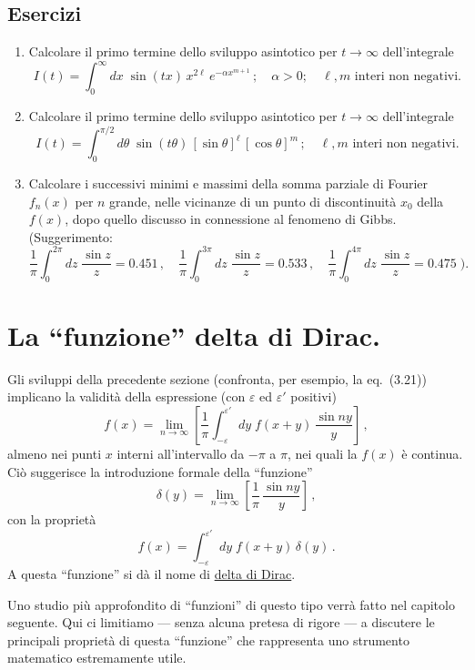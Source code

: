 \documentclass[11pt, a4paper]{book}
\numberwithin{equation}{section}
\newenvironment{esercizi}{\subsection*{Esercizi}\begin{enumerate}}{\end{enumerate}}
\begin{document}
\begin{esercizi}
\item Calcolare il primo termine dello sviluppo asintotico per $t\to\infty$ dell'integrale
\[
  I(t) = \int_0^\infty dx\;\sin(tx)\,x^{2\ell}\,e^{-\alpha x^{m+1}}\,;\quad
  \alpha>0;\quad \ell,m \text{ interi non negativi.}
\]

\item Calcolare il primo termine dello sviluppo asintotico per $t\to\infty$ dell'integrale
\[
  I(t) = \int_0^{\pi/2} d\theta\;\sin(t\theta)\,[\sin\theta]^\ell\,[\cos\theta]^m\,;\quad
  \ell,m \text{ interi non negativi.}
\]

\item Calcolare i successivi minimi e massimi della somma parziale di Fourier $f_n(x)$ per $n$ grande, nelle vicinanze di un punto di discontinuità $x_0$ della $f(x)$, dopo quello discusso in connessione al fenomeno di Gibbs. (Suggerimento:
\[
  \frac{1}{\pi}\int_0^{2\pi} dz\;\frac{\sin z}{z} = 0.451\,,\quad
  \frac{1}{\pi}\int_0^{3\pi} dz\;\frac{\sin z}{z} = 0.533\,,\quad
  \frac{1}{\pi}\int_0^{4\pi} dz\;\frac{\sin z}{z} = 0.475\;\biggr).
\]
\end{esercizi}

\section{La ``funzione'' delta di Dirac.}

Gli sviluppi della precedente sezione (confronta, per esempio, la eq.\ (3.21)) implicano la validità della espressione (con $\varepsilon$ ed $\varepsilon'$ positivi)
\begin{equation}
  f(x) = \lim_{n\to\infty}\left[\frac{1}{\pi}\int_{-\varepsilon}^{\varepsilon'} dy\;
  f(x+y)\,\frac{\sin ny}{y}\right]\,, \tag{1}
\end{equation}
almeno nei punti $x$ interni all'intervallo da $-\pi$ a $\pi$, nei quali la $f(x)$ è continua. Ciò suggerisce la introduzione formale della ``funzione''
\begin{equation}
  \delta(y) = \lim_{n\to\infty}\left[\frac{1}{\pi}\,\frac{\sin ny}{y}\right]\,, \tag{2}
\end{equation}
con la proprietà
\begin{equation}
  f(x) = \int_{-\varepsilon}^{\varepsilon'} dy\;f(x+y)\,\delta(y)\,. \tag{3}
\end{equation}
A questa ``funzione'' si dà il nome di \underline{delta di Dirac}.

Uno studio più approfondito di ``funzioni'' di questo tipo verrà fatto nel capitolo seguente. Qui ci limitiamo --- senza alcuna pretesa di rigore --- a discutere le principali proprietà di questa ``funzione'' che rappresenta uno strumento matematico estremamente utile.
\end{document}
